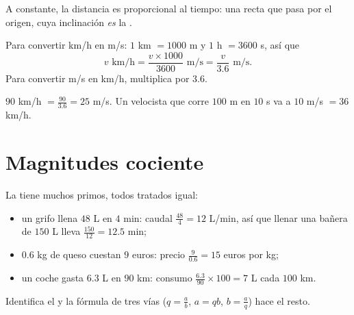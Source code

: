 \begin{omfigure}

{\small A  constante, la distancia es proporcional al tiempo: una
recta que pasa por el origen, cuya inclinación \emph{es} la
.}
\end{omfigure}

\begin{method}\label{met:g8:speed:convert}
Para convertir km/h en m/s: $1$ km $= 1000$ m y $1$ h $= 3600$ s, así que
\[
v \text{ km/h} = \frac{v \times 1000}{3600} \text{ m/s}
= \frac{v}{3.6} \text{ m/s}.
\]
Para convertir m/s en km/h, multiplica por $3.6$.
\end{method}

\begin{example}\label{ex:g8:speed:convert}
$90$ km/h $= \frac{90}{3.6} = 25$ m/s. Un velocista que corre $100$ m en
$10$ s va a $10$ m/s $= 36$ km/h.
\end{example}

\section{Magnitudes cociente}

\begin{example}\label{ex:g8:speed:quotients}
La  tiene muchos primos, todos tratados igual:
\begin{itemize}
  \item un grifo llena $48$ L en $4$ min: caudal
        $\frac{48}{4} = 12$ L/min, así que llenar una bañera de $150$ L lleva
        $\frac{150}{12} = 12.5$ min;
  \item $0.6$ kg de queso cuestan $9$ euros: precio
        $\frac{9}{0.6} = 15$ euros por kg;
  \item un coche gasta $6.3$ L en $90$ km: consumo
        $\frac{6.3}{90} \times 100 = 7$ L cada $100$ km.
\end{itemize}
Identifica el  y la fórmula de tres vías
($q = \frac ab$, $a = qb$, $b = \frac aq$) hace el resto.
\end{example}

